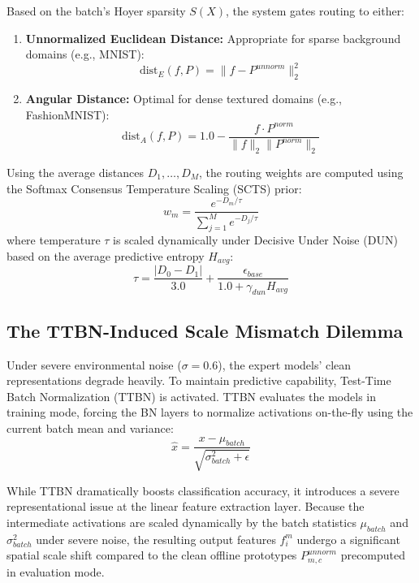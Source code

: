 \documentclass{article}
\theoremstyle{plain}
\theoremstyle{definition}
\theoremstyle{remark}
\begin{document}
Based on the batch's Hoyer sparsity $S(X)$, the system gates routing to either:
\begin{enumerate}
    \item \textbf{Unnormalized Euclidean Distance:} Appropriate for sparse background domains (e.g., MNIST):
    \begin{equation}
        \text{dist}_{E}(f, P) = \|f - P^{unnorm}\|_2^2
    \end{equation}
    \item \textbf{Angular Distance:} Optimal for dense textured domains (e.g., FashionMNIST):
    \begin{equation}
        \text{dist}_{A}(f, P) = 1.0 - \frac{f \cdot P^{norm}}{\|f\|_2 \|P^{norm}\|_2}
    \end{equation}
\end{enumerate}

Using the average distances $D_1, \dots, D_M$, the routing weights are computed using the Softmax Consensus Temperature Scaling (SCTS) prior:
\begin{equation}
    w_m = \frac{e^{-D_m / \tau}}{\sum_{j=1}^M e^{-D_j / \tau}}
\end{equation}
where temperature $\tau$ is scaled dynamically under Decisive Under Noise (DUN) \cite{anonymous} based on the average predictive entropy $H_{avg}$:
\begin{equation}
    \tau = \frac{|D_0 - D_1|}{3.0} + \frac{\epsilon_{base}}{1.0 + \gamma_{dun} H_{avg}}
\end{equation}

\subsection{The TTBN-Induced Scale Mismatch Dilemma}

Under severe environmental noise ($\sigma=0.6$), the expert models' clean representations degrade heavily. To maintain predictive capability, Test-Time Batch Normalization (TTBN) is activated. TTBN evaluates the models in training mode, forcing the BN layers to normalize activations on-the-fly using the current batch mean and variance:
\begin{equation}
    \hat{x} = \frac{x - \mu_{batch}}{\sqrt{\sigma^2_{batch} + \epsilon}}
\end{equation}

While TTBN dramatically boosts classification accuracy, it introduces a severe representational issue at the linear feature extraction layer. Because the intermediate activations are scaled dynamically by the batch statistics $\mu_{batch}$ and $\sigma^2_{batch}$ under severe noise, the resulting output features $f^m_i$ undergo a significant spatial scale shift compared to the clean offline prototypes $P_{m, c}^{unnorm}$ precomputed in evaluation mode. 
\end{document}
